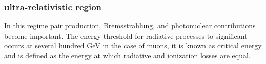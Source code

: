 \subsubsection{ultra-relativistic region}

In this regime pair production, Bremsstrahlung, and photonuclear contributions become important. The energy threshold for radiative processes to significant occurs at several hundred \unit{\giga\eV} in the case of muons, it is known as critical energy and is defined as the energy at which radiative and ionization losses are equal.